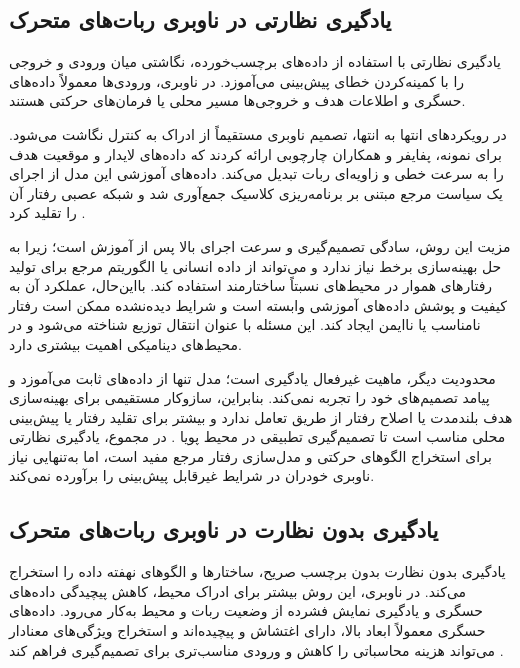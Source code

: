 \subsection{یادگیری نظارتی در ناوبری ربات‌های متحرک}

یادگیری نظارتی%
با استفاده از داده‌های برچسب‌خورده، نگاشتی میان ورودی و خروجی را با کمینه‌کردن خطای پیش‌بینی می‌آموزد. در ناوبری، ورودی‌ها معمولاً داده‌های حسگری و اطلاعات هدف و خروجی‌ها مسیر محلی یا فرمان‌های حرکتی هستند.

در رویکردهای انتها به انتها، تصمیم ناوبری مستقیماً از ادراک به کنترل نگاشت می‌شود. برای نمونه، پفایفر%
و همکاران چارچوبی ارائه کردند که داده‌های لایدار و موقعیت هدف را به سرعت خطی و زاویه‌ای ربات تبدیل می‌کند. داده‌های آموزشی این مدل از اجرای یک سیاست مرجع مبتنی بر برنامه‌ریزی کلاسیک جمع‌آوری شد و شبکه عصبی رفتار آن را تقلید کرد %
\cite{pfeiffer2018nav}.

مزیت این روش، سادگی تصمیم‌گیری و سرعت اجرای بالا پس از آموزش است؛ زیرا به حل بهینه‌سازی برخط نیاز ندارد و می‌تواند از داده انسانی یا الگوریتم مرجع برای تولید رفتارهای هموار در محیط‌های نسبتاً ساختارمند استفاده کند. بااین‌حال، عملکرد آن به کیفیت و پوشش داده‌های آموزشی وابسته است و شرایط دیده‌نشده ممکن است رفتار نامناسب یا ناایمن ایجاد کند. این مسئله با عنوان انتقال توزیع%
% 
شناخته می‌شود و در محیط‌های دینامیکی اهمیت بیشتری دارد.

محدودیت دیگر، ماهیت غیرفعال یادگیری است؛ مدل تنها از داده‌های ثابت می‌آموزد و پیامد تصمیم‌های خود را تجربه نمی‌کند. بنابراین، سازوکار مستقیمی برای بهینه‌سازی هدف بلندمدت یا اصلاح رفتار از طریق تعامل ندارد و بیشتر برای تقلید رفتار یا پیش‌بینی محلی مناسب است تا تصمیم‌گیری تطبیقی در محیط پویا %
\cite{alvarez2024DRLsurvey}.
در مجموع، یادگیری نظارتی برای استخراج الگوهای حرکتی و مدل‌سازی رفتار مرجع مفید است، اما به‌تنهایی نیاز ناوبری خودران در شرایط غیرقابل پیش‌بینی را برآورده نمی‌کند.

\subsection{یادگیری بدون نظارت در ناوبری ربات‌های متحرک}

یادگیری بدون نظارت%
بدون برچسب صریح، ساختارها و الگوهای نهفته داده را استخراج می‌کند. در ناوبری، این روش بیشتر برای ادراک محیط، کاهش پیچیدگی داده‌های حسگری و یادگیری نمایش فشرده از وضعیت ربات و محیط به‌کار می‌رود. داده‌های حسگری معمولاً ابعاد بالا، دارای اغتشاش و پیچیده‌اند و استخراج ویژگی‌های معنادار می‌تواند هزینه محاسباتی را کاهش و ورودی مناسب‌تری برای تصمیم‌گیری فراهم کند %
\cite{Zhu2021,s25113394}. 

